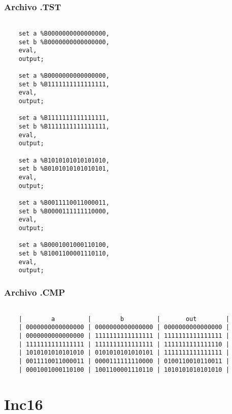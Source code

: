 \documentclass[12pt]{article}
\begin{document}
\subsubsection{Archivo .TST}
\begin{lstlisting}

	set a %B0000000000000000,
	set b %B0000000000000000,
	eval,
	output;

	set a %B0000000000000000,
	set b %B1111111111111111,
	eval,
	output;

	set a %B1111111111111111,
	set b %B1111111111111111,
	eval,
	output;

	set a %B1010101010101010,
	set b %B0101010101010101,
	eval,
	output;

	set a %B0011110011000011,
	set b %B0000111111110000,
	eval,
	output;

	set a %B0001001000110100,
	set b %B1001100001110110,
	eval,
	output;

\end{lstlisting}


\subsubsection{Archivo .CMP}
\begin{lstlisting}

	|        a         |        b         |       out        |
	| 0000000000000000 | 0000000000000000 | 0000000000000000 |
	| 0000000000000000 | 1111111111111111 | 1111111111111111 |
	| 1111111111111111 | 1111111111111111 | 1111111111111110 |
	| 1010101010101010 | 0101010101010101 | 1111111111111111 |
	| 0011110011000011 | 0000111111110000 | 0100110010110011 |
	| 0001001000110100 | 1001100001110110 | 1010101010101010 |
\end{lstlisting}
\newpage
\section{Inc16}
\end{document}
